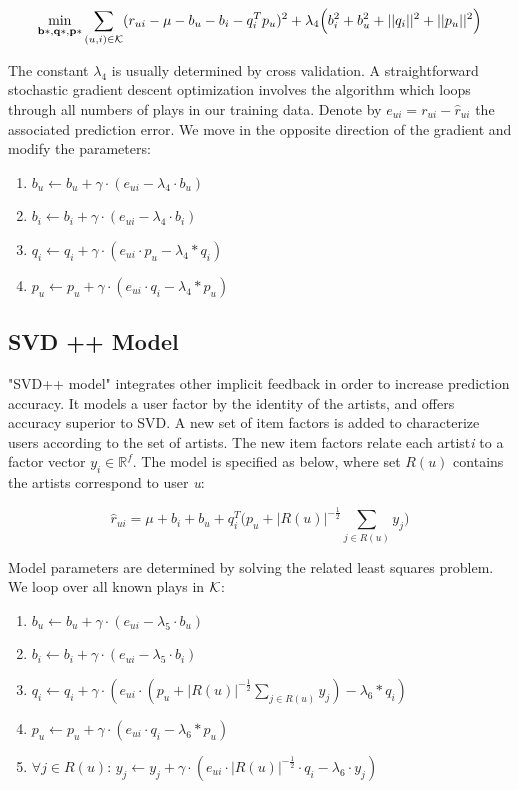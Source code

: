 \documentclass[11pt]{article}
\theoremstyle{definition}
\begin{document}
$$\min_{{\bf b}*,{\bf q}*,{\bf p}*} \sum_{(u, i) \in {\cal K}} (r_{ui} - \mu - b_u - b_i - q_i^Tp_u)^2 + \lambda_4 \Big(b_i^2 + b_u^2 + ||q_i||^2 + ||p_u||^2 \Big)$$

The constant $\lambda_4$ is usually determined by cross validation. A straightforward stochastic gradient descent optimization involves the algorithm which loops through all numbers of plays in our training data. Denote by $e_{ui} = r_{ui} - \hat{r}_{ui}$ the associated prediction error. We move in the opposite direction of the gradient and modify the parameters:

\begin{enumerate}
  \item $b_u \leftarrow b_u+\gamma \cdot(e_{ui}-\lambda_4 \cdot b_u)$
  \item $b_i \leftarrow b_i +\gamma \cdot (e_{ui}-\lambda_4 \cdot b_i)$
  \item $q_i \leftarrow q_i + \gamma \cdot(e_{ui}\cdot p_u - \lambda_4*q_i)$
  \item $p_u \leftarrow p_u + \gamma \cdot(e_{ui}\cdot q_i - \lambda_4*p_u)$
  
\end{enumerate}

\subsection{SVD ++ Model}
"SVD++ model" integrates other implicit feedback  in order to increase prediction accuracy. It models a user factor by the identity of the artists, and offers accuracy superior to SVD. A new set of item factors is added to characterize users according to the set of artists. The new item factors relate each artist\textit{i} to a factor vector $y_i \in \mathbb{R}^f$. The model is specified as below, where set $R(u)$ contains the artists correspond to user \textit{u}:

$$\hat{r}_{ui} =\mu+b_i+b_u+q_i^T \Big(p_u+|R(u)|^{-\frac{1}{2}} \sum_{j \in R(u)}y_j \Big)$$

Model parameters are determined by solving the related least squares problem. We loop over all known plays in ${\cal K}$:

\begin{enumerate}
  \item $b_u \leftarrow b_u+\gamma \cdot(e_{ui}-\lambda_5 \cdot b_u)$
  \item $b_i \leftarrow b_i +\gamma \cdot (e_{ui}-\lambda_5 \cdot b_i)$
  \item $q_i \leftarrow q_i + \gamma \cdot(e_{ui}\cdot (p_u + |R(u)|^{-\frac{1}{2}}\sum_{j \in R(u)}y_j)- \lambda_6*q_i)$
  \item $p_u \leftarrow p_u + \gamma \cdot(e_{ui}\cdot q_i - \lambda_6*p_u)$
  \item $\forall  j \in R(u)$:
  $y_j \leftarrow y_j+\gamma \cdot(e_{ui} \cdot|R(u)|^{-\frac{1}{2}} \cdot q_i - \lambda_6 \cdot y_j)$
  

\end{enumerate}
  
\end{document}
